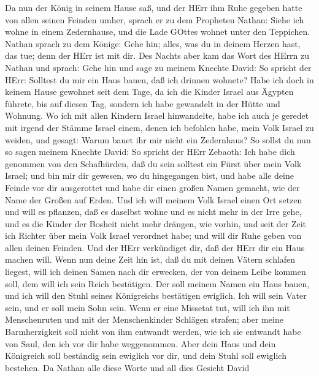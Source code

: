  Da nun der König in seinem Hause saß, und der HErr ihm Ruhe
gegeben hatte von allen seinen Feinden umher,  sprach er zu
dem Propheten Nathan: Siehe ich wohne in einem Zedernhause, und die Lade
GOttes wohnet unter den Teppichen.  Nathan sprach zu dem
Könige: Gehe hin; alles, was du in deinem Herzen hast, das tue; denn der
HErr ist mit dir.  Des Nachts aber kam das Wort des HErrn zu
Nathan und sprach:  Gehe hin und sage zu meinem Knechte
David: So spricht der HErr: Solltest du mir ein Haus bauen, daß ich
drinnen wohnete?  Habe ich doch in keinem Hause gewohnet
seit dem Tage, da ich die Kinder Israel aus Ägypten führete, bis auf
diesen Tag, sondern ich habe gewandelt in der Hütte und Wohnung.
 Wo ich mit allen Kindern Israel hinwandelte, habe ich auch
je geredet mit irgend der Stämme Israel einem, denen ich befohlen habe,
mein Volk Israel zu weiden, und gesagt: Warum bauet ihr mir nicht ein
Zedernhaus?  So sollst du nun so sagen meinem Knechte David:
So spricht der HErr Zebaoth: Ich habe dich genommen von den Schafhürden,
daß du sein solltest ein Fürst über mein Volk Israel;  und
bin mir dir gewesen, wo du hingegangen bist, und habe alle deine Feinde
vor dir ausgerottet und habe dir einen großen Namen gemacht, wie der
Name der Großen auf Erden.  Und ich will meinem Volk Israel
einen Ort setzen und will es pflanzen, daß es daselbst wohne und es
nicht mehr in der Irre gehe, und es die Kinder der Bosheit nicht mehr
drängen, wie vorhin,  und seit der Zeit ich Richter über
mein Volk Israel verordnet habe; und will dir Ruhe geben von allen
deinen Feinden. Und der HErr verkündiget dir, daß der HErr dir ein Haus
machen will.  Wenn nun deine Zeit hin ist, daß du mit
deinen Vätern schlafen liegest, will ich deinen Samen nach dir erwecken,
der von deinem Leibe kommen soll, dem will ich sein Reich bestätigen.
 Der soll meinem Namen ein Haus bauen, und ich will den
Stuhl seines Königreichs bestätigen ewiglich.  Ich will
sein Vater sein, und er soll mein Sohn sein. Wenn er eine Missetat tut,
will ich ihn mit Menschenruten und mit der Menschenkinder Schlägen
strafen;  aber meine Barmherzigkeit soll nicht von ihm
entwandt werden, wie ich sie entwandt habe von Saul, den ich vor dir
habe weggenommen.  Aber dein Haus und dein Königreich soll
beständig sein ewiglich vor dir, und dein Stuhl soll ewiglich bestehen.
 Da Nathan alle diese Worte und all dies Gesicht David
